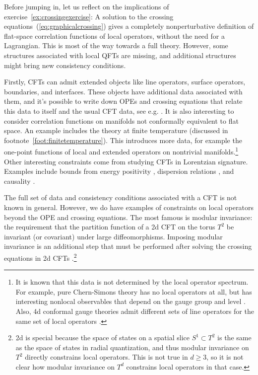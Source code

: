 \documentclass[11pt]{ws-rv9x6}
\newcommand\<\langle
\renewcommand\>\rangle
\renewcommand\.{\cdot}
\begin{document}
Before jumping in, let us reflect on the implications of exercise~\ref{ex:crossingexercise}:  A solution to the crossing equations~(\ref{eq:graphicalcrossing}) gives a completely nonperturbative definition of flat-space correlation functions of local operators, without the need for a Lagrangian.  This is most of the way towards a full theory. However, some structures associated with local QFTs are missing, and additional structures might bring new consistency conditions.

Firstly, CFTs can admit extended objects like line operators, surface operators, boundaries, and interfaces. These objects have additional data associated with them, and it's possible to write down OPEs and crossing equations that relate this data to itself and the usual CFT data, see e.g. \cite{Liendo:2012hy,Gaiotto:2013nva}.  It is also interesting to consider correlation functions on manifolds not conformally equivalent to flat space. An example includes the theory at finite temperature (discussed in footnote~\ref{foot:finitetemperature}). This introduces more data, for example the one-point functions of local and extended operators on nontrivial manifolds.\footnote{It is known that this data is not determined by the local operator spectrum.  For example, pure Chern-Simons theory has no local operators at all, but has interesting nonlocal observables that depend on the gauge group and level \cite{Witten:1988hf}.  Also, 4d conformal gauge theories admit different sets of line operators for the same set of local operators \cite{Aharony:2013hda}.} Other interesting constraints come from studying CFTs in Lorentzian signature. Examples include bounds from energy positivity \cite{Hofman:2008ar}, dispersion relations \cite{Komargodski:2011vj,Nachtmann:1973mr,Komargodski:2012ek,Komargodski:2016gci}, and causality \cite{Maldacena:2015waa,Hartman:2015lfa}.

The full set of data and consistency conditions associated with a CFT is not known in general. However, we do have examples of constraints on local operators beyond the OPE and crossing equations. The most famous is modular invariance: the requirement that the partition function of a 2d CFT on the torus $T^2$ be invariant (or covariant) under large diffeomorphisms.  Imposing modular invariance is an additional step that must be performed after solving the crossing equations in 2d CFTs \cite{Moore:1988uz}.\footnote{2d is special because the space of states on a spatial slice $S^1\subset T^2$ is the same as the space of states in radial quantization, and thus modular invariance on $T^2$ directly constrains local operators.  This is not true in $d\geq 3$, so it is not clear how modular invariance on $T^d$ constrains local operators in that case.}
\end{document}
